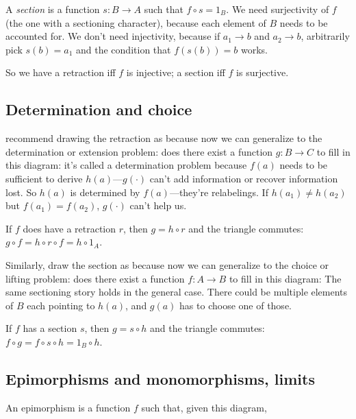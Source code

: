 \documentclass[11pt]{article}
\begin{document}
A {\em section} is a function $s:B\to A$ such that $f\circ s=1_B$. We need surjectivity of
$f$ (the one with a sectioning character), because each element of $B$ needs to
be accounted for. We don't need injectivity, because if $a_1\to b$ and $a_2\to b$,
arbitrarily pick $s(b)=a_1$ and the condition that $f(s(b))=b$ works.

So we have a retraction iff $f$ is injective; a section iff $f$ is surjective.

\subsection{Determination and choice}

\cite{lawvere:conceptual} recommend drawing the retraction as
because now we can generalize to the determination or extension problem: does there exist
a function $g:B\to C$ to fill in this diagram:
it's called a determination problem because $f(a)$ needs to be sufficient to derive
$h(a)$---$g(\cdot)$ can't add information or recover information lost. So $h(a)$ is
determined by $f(a)$---they're relabelings. If $h(a_1)\neq h(a_2)$ but $f(a_1)=f(a_2)$, $g(\cdot)$ can't
help us.

If $f$ does have a retraction $r$, then $g=h\circ r$ and the triangle commutes: $g\circ f =  h\circ r\circ f = h\circ 1_A$.

Similarly, draw the section as
because now we can generalize to the choice or lifting problem: does there exist
a function $f:A\to B$ to fill in this diagram:
The same sectioning story holds in the general case. There could be multiple elements of
$B$ each pointing to $h(a)$, and $g(a)$ has to choose one of those.

If $f$ has a section $s$, then $g=s\circ h$ and the triangle commutes: $f\circ g =  f\circ s\circ h = 1_B\circ h$.

\subsection{Epimorphisms and monomorphisms, limits}
An epimorphism is a function $f$ such that, given this diagram,
\end{document}
